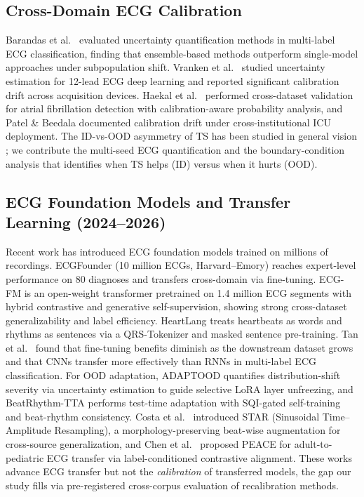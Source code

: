 \documentclass[review,12pt,nonatbib]{elsarticle}
\begin{document}
\subsection{Cross-Domain ECG Calibration}
Barandas et al.\ \cite{barandas2023} evaluated uncertainty
quantification methods in multi-label ECG classification, finding that
ensemble-based methods outperform single-model approaches under
subpopulation shift. Vranken et al.\ \cite{zhang2022} studied
uncertainty estimation for 12-lead ECG deep learning and reported
significant calibration drift across acquisition devices. Haekal et
al.\ \cite{physiolmeas2026} performed cross-dataset validation for
atrial fibrillation detection with calibration-aware probability
analysis, and Patel \& Beedala \cite{medrxiv2026} documented
calibration drift under cross-institutional ICU deployment. The
ID-vs-OOD asymmetry of TS has been studied in general vision
\cite{ovadia2019calibration}; we contribute the multi-seed ECG
quantification and the boundary-condition analysis that identifies
when TS helps (ID) versus when it hurts (OOD).

\subsection{ECG Foundation Models and Transfer Learning (2024--2026)}
Recent work has introduced ECG foundation models trained on millions
of recordings. ECGFounder \cite{ecgfounder2024,song2024ecgfm}
(10 million ECGs, Harvard--Emory) reaches expert-level performance on
80 diagnoses and transfers cross-domain via fine-tuning. ECG-FM
\cite{ecgfm2024} is an open-weight transformer pretrained on 1.4
million ECG segments with hybrid contrastive and generative
self-supervision, showing strong cross-dataset generalizability and
label efficiency. HeartLang \cite{heartlang2025} treats heartbeats as
words and rhythms as sentences via a QRS-Tokenizer and masked
sentence pre-training. Tan et al.\ \cite{transferecg2025} found that
fine-tuning benefits diminish as the downstream dataset grows and
that CNNs transfer more effectively than RNNs in multi-label ECG
classification. For OOD adaptation, ADAPTOOD \cite{adaptood2026}
quantifies distribution-shift severity via uncertainty estimation to
guide selective LoRA layer unfreezing, and BeatRhythm-TTA
\cite{beatrhythm2026} performs test-time adaptation with SQI-gated
self-training and beat-rhythm consistency. Costa et al.\
\cite{star2025} introduced STAR (Sinusoidal Time--Amplitude
Resampling), a morphology-preserving beat-wise augmentation for
cross-source generalization, and Chen et al.\ \cite{peace2026}
proposed PEACE for adult-to-pediatric ECG transfer via
label-conditioned contrastive alignment. These works advance ECG
transfer but not the \emph{calibration} of transferred models, the
gap our study fills via pre-registered cross-corpus evaluation of
recalibration methods.
\end{document}

